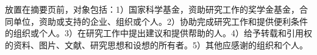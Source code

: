  \setlength{\baselineskip}{20pt}
\begin{thanks}
[内容为小四号宋体。]放置在摘要页前，对象包括：1）国家科学基金，资助研究工作的奖学金基金，合同单位，资助或支持的企业、组织或个人。2）协助完成研究工作和提供便利条件的组织或个人。3）在研究工作中提出建议和提供帮助的人。4）给予转载和引用权的资料、图片、文献、研究思想和设想的所有者。5）其他应感谢的组织和个人。


\end{thanks}